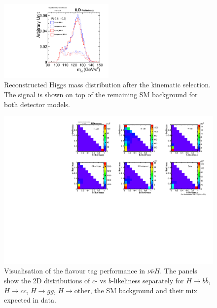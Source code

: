 \begin{figure}[htbp]
\begin{center}
 \includegraphics[width=0.5\textwidth]{Performance/fig/IDRplot5.pdf}
\end{center}
\caption{Reconstructed Higgs mass distribution after the kinematic selection. The signal is shown on top of the remaining SM background for both detector models.
}
\label{fig:Hbbccgg:mh}
\end{figure}


\begin{figure}[htbp]
\begin{center}
 \includegraphics[width=\textwidth]{Performance/fig/IDRplot4.pdf}
\end{center}
\caption{Visualisation of the flavour tag performance in $\nu\bar{\nu} H$. The panels show the 2D distributions of $c$- vs $b$-likeliness separately for $H \to b\bar{b}$, $H \to c\bar{c}$, $H \to gg$, $H \to$other, the SM background and their mix expected in data.
}
\label{fig:Hbbccgg:likeli}
\end{figure}

